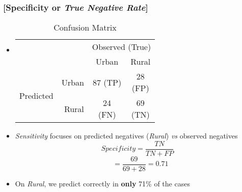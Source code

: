 \documentclass[xcolor=x11names,compress, aspectratio=169]{beamer}
\renewcommand{\(}{\begin{columns}}
\renewcommand{\)}{\end{columns}}
\newcommand{\<}[1]{\begin{column}{#1}}
\renewcommand{\>}{\end{column}}
\begin{document}
\begin{frame} %
\frametitle{\textcolor{brique}{[Specificity or \textit{True Negative Rate}]}}
\begin{itemize}[<+->]
  \item[]
    \begin{table}[]
    \begin{tabular}{l r|c|c|}

                              & & \multicolumn{2}{c|}{Observed (True)}                                                                                          \\
                              & &    Urban  &  Rural  \\  \hline
    \multirow{2}{*}{Predicted}& Urban & \shortstack[c]{$87$ \\ \tiny{(TP)}}& \shortstack[c]{28 \\ \tiny{(FP)}} \\ \cline{2-4}
                              & Rural &  \shortstack[c]{24 \\ \tiny{(FN)}}& \shortstack[c]{69 \\ \tiny{(TN)}} \\ \hline
    \end{tabular}
    \caption{Confusion Matrix}
    \end{table}
  \item \textit{Sensitivity} focuses on  predicted negatives (\textit{Rural}) \textit{vs} observed negatives
   $$ Specificity = \frac{TN}{TN + FP} $$
   $$
 \; \; \;  =  \frac{69}{69+28} = 0.71
 $$
  \item On \textit{Rural}, we predict correctly in \textbf{only} 71\% of the cases
\end{itemize}
\end{frame}
\end{document}
